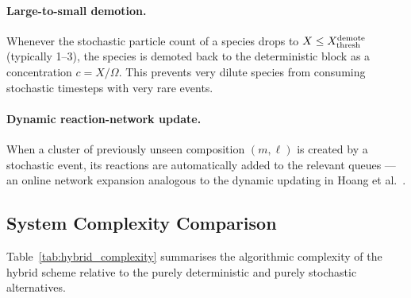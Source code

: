 \paragraph{Large-to-small demotion.}
Whenever the stochastic particle count of a species drops to
$X \leq X_{\rm thresh}^{\rm demote}$ (typically 1--3),
the species is demoted back to the deterministic block as a
concentration $c = X/\Omega$.  This prevents very dilute
species from consuming stochastic timesteps with very rare events.

\paragraph{Dynamic reaction-network update.}
When a cluster of previously unseen composition $(m,\ell)$ is
created by a stochastic event, its reactions are automatically
added to the relevant queues --- an online network expansion
analogous to the dynamic updating in Hoang et al.~\cite{Hoang2015}.

\subsection{System Complexity Comparison}
\label{sec:hybrid_complexity}

Table~\ref{tab:hybrid_complexity} summarises the algorithmic
complexity of the hybrid scheme relative to the purely deterministic
and purely stochastic alternatives.

